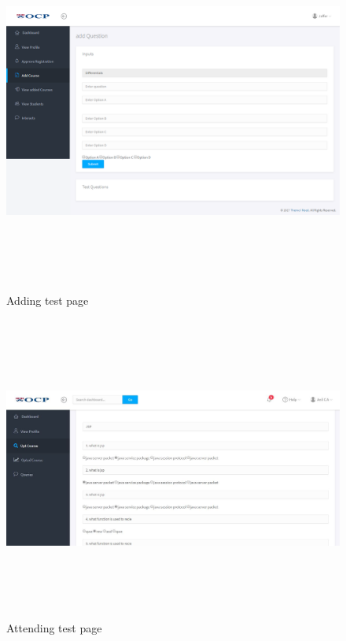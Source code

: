 \begin{figure}[!h]
	\begin{center}
		\includegraphics[width=15cm,height=12cm]{addTest.png}
	\end{center}
\caption{Adding test page}
\end{figure}

\begin{figure}[!h]
	\begin{center}
		\includegraphics[width=15cm,height=10cm]{test.jpg}
	\end{center}
\caption{Attending test page}
\end{figure}

